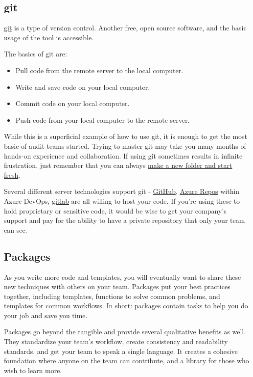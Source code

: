 \documentclass[
]{book}
\providecommand{\tightlist}{%
  \setlength{\itemsep}{0pt}\setlength{\parskip}{0pt}}
\begin{document}
\hypertarget{git}{%
\subsection{git}\label{git}}

\href{https://git-scm.com}{git} is a type of version control. Another free, open source software, and the basic usage of the tool is accessible.

The basics of git are:

\begin{itemize}
\tightlist
\item
  Pull code from the remote server to the local computer.
\item
  Write and save code on your local computer.
\item
  Commit code on your local computer.
\item
  Push code from your local computer to the remote server.
\end{itemize}

While this is a superficial example of how to use git, it is enough to get the most basic of audit teams started. Trying to master git may take you many months of hands-on experience and collaboration. If using git sometimes results in infinite frustration, just remember that you can always \href{https://xkcd.com/1597/}{make a new folder and start fresh}.

Several different server technologies support git - \href{https://github.com}{GitHub}, \href{https://azure.microsoft.com/en-us/services/devops/repos/}{Azure Repos} within Azure DevOps, \href{https://gitlab.com}{gitlab} are all willing to host your code. If you're using these to hold proprietary or sensitive code, it would be wise to get your company's support and pay for the ability to have a private repository that only your team can see.

\hypertarget{packages}{%
\subsection{Packages}\label{packages}}

As you write more code and templates, you will eventually want to share these new techniques with others on your team. Packages put your best practices together, including templates, functions to solve common problems, and templates for common workflows. In short: packages contain tasks to help you do your job and save you time.

Packages go beyond the tangible and provide several qualitative benefits as well. They standardize your team's workflow, create consistency and readability standards, and get your team to speak a single language. It creates a cohesive foundation where anyone on the team can contribute, and a library for those who wish to learn more.
\end{document}
